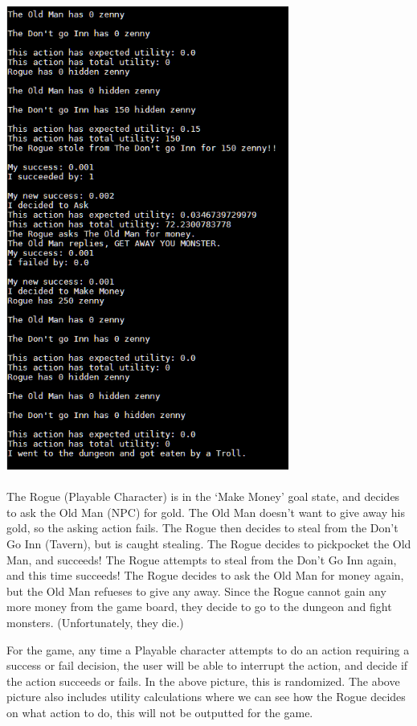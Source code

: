 \documentclass{article}
\theoremstyle{definition}
\begin{document}
\includegraphics[height = 6in]{"UML part 2"}
\\ \\
\indent The Rogue (Playable Character) is in the `Make Money' goal state, and decides to 
ask the Old Man (NPC) for gold. The Old Man doesn't want to give away his gold, so
the asking action fails. The Rogue then decides to steal from the Don't Go Inn 
(Tavern), but is caught stealing. The Rogue decides to pickpocket the Old
Man, and succeeds! The Rogue attempts to steal from the Don't Go Inn again, and
this time succeeds! The Rogue decides to ask the Old Man for money again, but the
Old Man refueses to give any away. Since the Rogue cannot gain any more money from
the game board, they decide to go to the dungeon and fight monsters. (Unfortunately, 
they die.)

For the game, any time a Playable character attempts to do an action requiring
a success or fail decision, the user will be able to interrupt the action, and
decide if the action succeeds or fails. In the above picture, this is randomized.
The above picture also includes utility calculations where we can see how the
Rogue decides on what action to do, this will not be outputted for the game.
\end{document}
